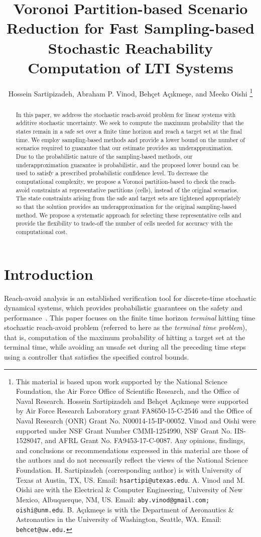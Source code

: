 \documentclass[11pt,letterpaper]{article}
\date{}
\title{Voronoi Partition-based Scenario Reduction for Fast Sampling-based Stochastic Reachability Computation of LTI Systems}
\author{Hossein Sartipizadeh, Abraham P. Vinod,  Beh{\c{c}}et A{\c{c}}{\i}kme{\c{s}}e, and Meeko Oishi
	\thanks{This material is based upon work supported by the National Science Foundation, the Air Force Office of Scientific Research, and the Office of Naval Research.  Hossein Sartipizadeh and Beh{\c{c}}et A{\c{c}}{\i}kme{\c{s}}e were supported by Air Force Research Laboratory grant FA8650-15-C-2546 and the Office of Naval Research (ONR) Grant No. N00014-15-IP-00052. %
    Vinod and Oishi were supported under NSF Grant Number CMMI-1254990, NSF Grant No. IIS-1528047, and AFRL Grant No. FA9453-17-C-0087. Any opinions, findings, and conclusions or recommendations expressed in this material are those of the authors and do not necessarily reflect the views of the National Science Foundation. \newline
    H. Sartipizadeh (corresponding author) is with University of Texas at Austin, TX, US. Email: {\tt hsartipi@utexas.edu}.\newline 
		A. Vinod and M. Oishi are with the Electrical \& Computer Engineering, University of New Mexico, Albuquerque, NM, US. Email: {\tt aby.vinod@gmail.com; oishi@unm.edu}.\newline
		B. A{\c{c}}{\i}kme{\c{s}}e is with the Department of Aeronautics \& Astronautics in the University of Washington, Seattle, WA. Email: {\tt behcet@uw.edu.}\newline
	}
}
\begin{document}
	
	\maketitle
	\thispagestyle{empty}
	\pagestyle{empty}
	
	
	\begin{abstract}

In this paper, we address the stochastic reach-avoid problem for linear systems with additive stochastic uncertainty.
We seek to compute the maximum probability that the states remain in a safe set over a finite time horizon and reach a target set at the final time.
We employ sampling-based methods and provide a lower bound on the number of scenarios required to guarantee that our estimate provides an underapproximation.
Due to the probabilistic nature of the sampling-based methods, our underapproximation guarantee is probabilistic, and the proposed lower bound can be used to satisfy a prescribed probabilistic confidence level. 
To decrease the computational complexity, we propose a Voronoi partition-based to check the  reach-avoid constraints at representative partitions (cells), instead of the original scenarios. 
The state constraints arising from the safe and target sets are tightened appropriately so that the solution  provides an underapproximation for the original sampling-based method. 
We propose a systematic approach for selecting these representative cells and provide the flexibility to trade-off the number of cells needed for accuracy with the computational cost.      
	\end{abstract}
	
	
	\section{Introduction} \label{sec:Intro}
	
    Reach-avoid analysis is an established verification tool for discrete-time stochastic dynamical systems, which provides probabilistic guarantees on the safety and performance~\cite{SummersAutomatica2010,HomChaudhuriACC2017,MaloneHSCC2014,lesser2013stochastic,GleasonCDC2017}. This paper focuses on the finite time horizon \emph{terminal} hitting
    time stochastic reach-avoid problem \cite{SummersAutomatica2010} (referred to here as the {\em terminal
    time problem}), that is, computation of the maximum probability
    of hitting a target set at the terminal time, while avoiding an unsafe set
    during all the preceding time steps using a controller that satisfies the
    specified control bounds.  
    
\end{document}
